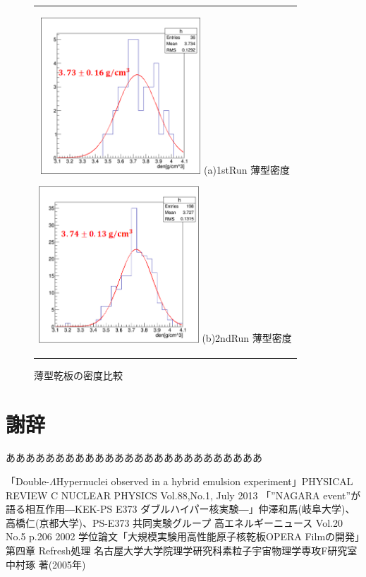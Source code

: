 \documentclass[12pt,a4paper]{jarticle}
\begin{document}
\begin{figure}[htbp]
  \centering
      \begin{tabular}{c}
        \begin{minipage}{0.5\hsize}
          \centering
            \includegraphics[clip, width=60mm]{1stRun_thin_den.png}
            \hspace{1.6cm} (a)1stRun 薄型密度
        \end{minipage}
        
        \begin{minipage}{0.5\hsize}
          \centering
            \includegraphics[clip, width=60mm]{2ndRun_thin_den.png}
            \hspace{1.6cm} (b)2ndRun 薄型密度
        \end{minipage}
    
      \end{tabular}
      \caption{薄型乾板の密度比較\label{fig:compare_thin_den}}
\end{figure}
\newpage
\section*{謝辞}
ああああああああああああああああああああああああああ
\begin{thebibliography}{99}
 「Double-$\Lambda$Hypernuclei observed in a hybrid emulsion experiment」PHYSICAL REVIEW C NUCLEAR PHYSICS Vol.88,No.1, July 2013
 「”NAGARA event”が語る相互作用―KEK-PS E373 ダブルハイパー核実験―」仲澤和馬(岐阜大学)、高橋仁(京都大学)、PS-E373 共同実験グループ 高エネルギーニュース Vol.20 No.5 p.206 2002
 学位論文「大規模実験用高性能原子核乾板OPERA Filmの開発」第四章 Refresh処理 名古屋大学大学院理学研究科素粒子宇宙物理学専攻F研究室 中村琢 著(2005年)
\end{thebibliography}
\end{document}
